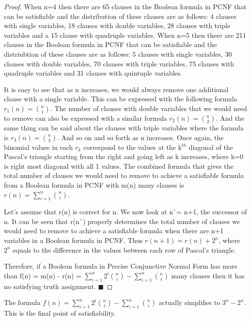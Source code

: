 \documentclass[runningheads,a4paper]{llncs}
\begin{document}
\begin{theorem}
\begin{proof}
When n=4 then there are 65 clauses in the Boolean formula in PCNF that can be satisfiable and the distribution of these clauses are as follows: 4 clauses with single variables, 18 clauses with double variables, 28 clauses with triple variables and a 15 clause with quadruple variables. When n=5 then there are 211 clauses in the Boolean formula in PCNF that can be satisfiable and the distriubtion of these clauses are as follows: 5 clauses with single variables, 30 clauses with double variables, 70 clauses with triple variables, 75 clauses with quadruple variables and 31 clauses with quintuple variables. 

It is easy to see that as n increases, we would always remove one additional clause with a single variable. This can be expressed with the following formula $r_{1}(n) = \binom{n} {1}$. The number of clauses with double variables that we would need to remove can also be expressed with a similar formula $r_{2}(n) = \binom{n} {2}$. And the same thing can be said about the clauses with triple variables where the formula is $r_{3}(n) = \binom{n} {3}$. And so on and so forth as n increases. Once again, the binomial values in each $r_{k}$ correspond to the values at the k$^{th}$ diagonal of the Pascal's triangle starting from the right and going left as k increases, where k=0 is right most diagonal with all 1 values. The combined formula that gives the total number of clauses we would need to remove to achieve a satisfiable formula from a Boolean formula in PCNF with m(n) many clauses is  $ r(n) = \sum_{i=1}^{n} \binom{n} {i}$. 

Let's assume that r(n) is correct for n. We now look at n\`{}= n+1, the successor of n. It can be seen that r(n\`{}) properly determines the total number of clauses we would need to remove to achieve a satisfiable formula when there are n+1 variables in a Boolean formula in PCNF. Thus $r(n+1) = r(n) + 2^{n} $, where $2^{n}$ equals to the difference in the values between each row of Pascal's triangle. 

Therefore, if a Boolean formula in Precise Conjunctive Normal Form has more than f(n) = m(n) - r(n) = $\sum_{i=1}^{n} 2^{i} \binom{n} {i} - \sum_{i=1}^{n} \binom{n} {i}$ many clauses then it has no satisfying truth assignment. $\blacksquare$

\end{proof}
\end{theorem}

The formula $ f(n) =  \sum_{i=1}^{n} 2^{i} \binom{n} {i} - \sum_{i=1}^{n} \binom{n} {i}$ actually simplifies to $3^{n}-2^{n}$. This is the final point of satisfiability. 
\end{document}

